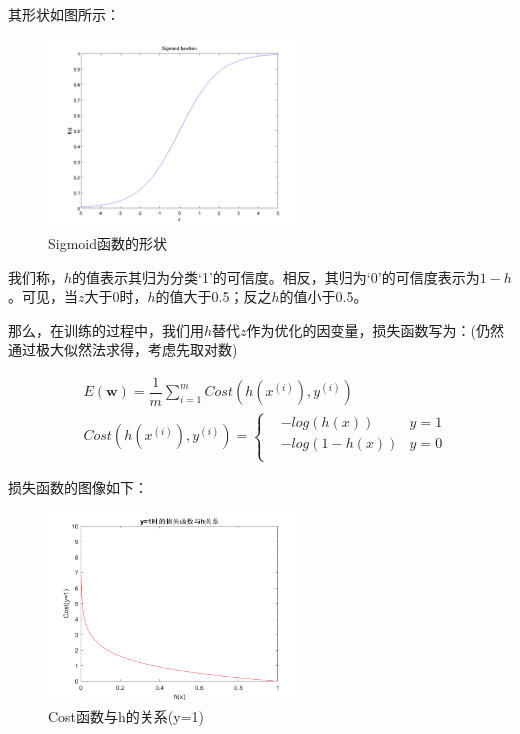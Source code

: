 其形状如图所示：

\begin{figure}[htbp]
   \centering
   \includegraphics[width=0.6\textwidth]{SigmoidFunction.png} %
   \caption{Sigmoid函数的形状}
   \label{fig:sigmoid}
\end{figure}

我们称，$h$的值表示其归为分类‘1’的可信度。相反，其归为‘0’的可信度表示为$1 - h$。可见，当$z$大于0时，$h$的值大于0.5；反之$h$的值小于0.5。

那么，在训练的过程中，我们用$h$替代$z$作为优化的因变量，损失函数写为：(仍然通过极大似然法求得，考虑先取对数\cite{standford_machine_learning_cs229})

\begin{equation}
\begin{aligned}
& E(\mathbf{w}) = \dfrac{1}{m} \sum^m_{i=1} Cost(h(x^{(i)}),y^{(i)}) \\
& Cost(h(x^{(i)}),y^{(i)}) = \left\{
\begin{aligned}
 & -log(h(x))   & y = 1 \\
 & -log(1-h(x)) & y = 0 \\
\end{aligned}
\right.
\end{aligned}
\end{equation}

损失函数的图像如下：
\begin{figure}[htbp]
   \centering
   \includegraphics[width=0.6\textwidth]{SigmoidCost1.png} %
   \caption{Cost函数与h的关系(y=1)}
   \label{fig:sigmoidcost1}
\end{figure}

